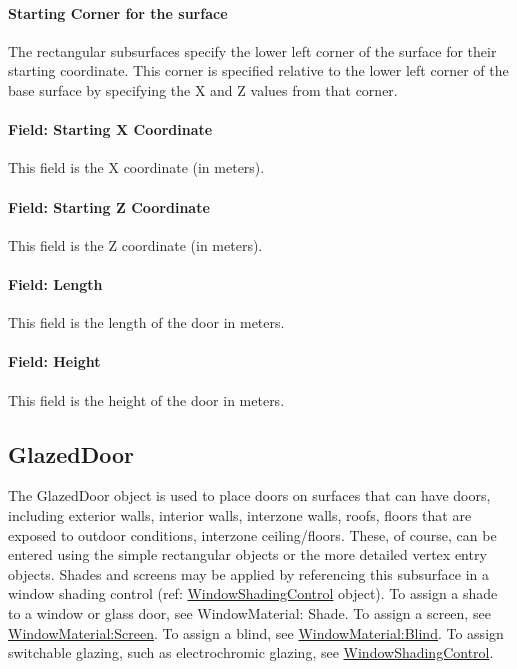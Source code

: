 \paragraph{Starting Corner for the surface}\label{starting-corner-for-the-surface-11}

The rectangular subsurfaces specify the lower left corner of the surface for their starting coordinate. This corner is specified relative to the lower left corner of the base surface by specifying the X and Z values from that corner.

\paragraph{Field: Starting X Coordinate}\label{field-starting-x-coordinate-11}

This field is the X coordinate (in meters).

\paragraph{Field: Starting Z Coordinate}\label{field-starting-z-coordinate-11}

This field is the Z coordinate (in meters).

\paragraph{Field: Length}\label{field-length-11}

This field is the length of the door in meters.

\paragraph{Field: Height}\label{field-height-5}

This field is the height of the door in meters.

\subsection{GlazedDoor}\label{glazeddoor}

The GlazedDoor object is used to place doors on surfaces that can have doors, including exterior walls, interior walls, interzone walls, roofs, floors that are exposed to outdoor conditions, interzone ceiling/floors. These, of course, can be entered using the simple rectangular objects or the more detailed vertex entry objects. Shades and screens may be applied by referencing this subsurface in a window shading control (ref: \hyperref[windowpropertyshadingcontrol]{WindowShadingControl} object). To assign a shade to a window or glass door, see WindowMaterial: Shade. To assign a screen, see \hyperref[windowmaterialscreen]{WindowMaterial:Screen}. To assign a blind, see \hyperref[windowmaterialblind]{WindowMaterial:Blind}. To assign switchable glazing, such as electrochromic glazing, see \hyperref[windowpropertyshadingcontrol]{WindowShadingControl}.

